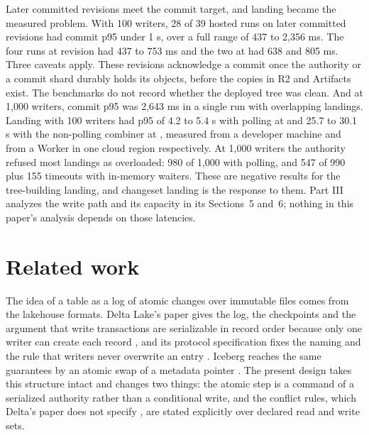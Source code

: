 \documentclass[11pt,letterpaper]{article}
\theoremstyle{definition}
\theoremstyle{remark}
\begin{document}
Later committed revisions meet the commit target, and landing became the measured problem. With 100 writers, 28 of 39 hosted runs on later committed revisions had commit p95 under 1 s, over a full range of 437 to 2,356 ms. %
The four runs at revision  had 437 to 753 ms and the two at  had 638 and 805 ms. %
Three caveats apply. These revisions acknowledge a commit once the authority or a commit shard durably holds its objects, before the copies in R2 and Artifacts exist. The benchmarks do not record whether the deployed tree was clean. And at 1,000 writers, commit p95 was 2,643 ms in a single run with overlapping landings. %
Landing with 100 writers had p95 of 4.2 to 5.4 s with polling at  and 25.7 to 30.1 s with the non-polling combiner at , measured from a developer machine and from a Worker in one cloud region respectively. %
At 1,000 writers the authority refused most landings as overloaded: 980 of 1,000 with polling, and 547 of 990 plus 155 timeouts with in-memory waiters. %
These are negative results for the tree-building landing, and changeset landing is the response to them. Part III analyzes the write path and its capacity in its Sections~5 and~6; nothing in this paper's analysis depends on those latencies.

\section{Related work}
\label{sec:tlsc:related}

The idea of a table as a log of atomic changes over immutable files comes from the lakehouse formats. Delta Lake's paper gives the log, the checkpoints and the argument that write transactions are serializable in record order because only one writer can create each record \cite{armbrust2020delta}, and its protocol specification fixes the naming and the rule that writers never overwrite an entry \cite{deltaprotocol}. Iceberg reaches the same guarantees by an atomic swap of a metadata pointer \cite{icebergspec}. The present design takes this structure intact and changes two things: the atomic step is a command of a serialized authority rather than a conditional write, and the conflict rules, which Delta's paper does not specify \cite{armbrust2020delta}, are stated explicitly over declared read and write sets.
\end{document}
